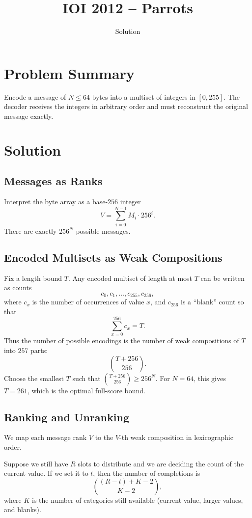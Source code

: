 \documentclass[11pt,a4paper]{article}
\title{IOI 2012 -- Parrots}
\author{Solution}
\date{}
\begin{document}
\maketitle

\section{Problem Summary}
Encode a message of $N \le 64$ bytes into a multiset of integers in $[0,255]$. The decoder receives the integers in arbitrary order and must reconstruct the original message exactly.

\section{Solution}

\subsection{Messages as Ranks}
Interpret the byte array as a base-$256$ integer
\[
V = \sum_{i=0}^{N-1} M_i \cdot 256^i .
\]
There are exactly $256^N$ possible messages.

\subsection{Encoded Multisets as Weak Compositions}
Fix a length bound $T$. Any encoded multiset of length at most $T$ can be written as counts
\[
c_0, c_1, \ldots, c_{255}, c_{256},
\]
where $c_x$ is the number of occurrences of value $x$, and $c_{256}$ is a ``blank'' count so that
\[
\sum_{x=0}^{256} c_x = T.
\]
Thus the number of possible encodings is the number of weak compositions of $T$ into $257$ parts:
\[
\binom{T + 256}{256}.
\]
Choose the smallest $T$ such that $\binom{T + 256}{256} \ge 256^N$. For $N = 64$, this gives $T = 261$, which is the optimal full-score bound.

\subsection{Ranking and Unranking}
We map each message rank $V$ to the $V$-th weak composition in lexicographic order.

Suppose we still have $R$ slots to distribute and we are deciding the count of the current value. If we set it to $t$, then the number of completions is
\[
\binom{(R - t) + K - 2}{K - 2},
\]
where $K$ is the number of categories still available (current value, larger values, and blanks).
\end{document}
